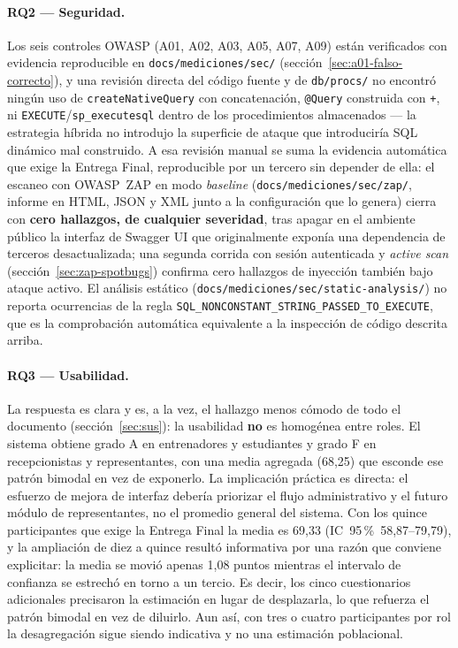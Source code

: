\documentclass[11pt,a4paper]{article}
\newcommand{\ruta}[1]{\texttt{\footnotesize #1}}
\begin{document}
\paragraph{RQ2 — Seguridad.} Los seis controles OWASP (A01, A02, A03, A05,
A07, A09) están verificados con evidencia reproducible en
\ruta{docs/mediciones/sec/} (sección~\ref{sec:a01-falso-correcto}), y una
revisión directa del código fuente y de \ruta{db/procs/} no encontró
ningún uso de \texttt{createNativeQuery} con concatenación, \texttt{@Query}
construida con \texttt{+}, ni \texttt{EXECUTE}/\texttt{sp\_executesql}
dentro de los procedimientos almacenados — la estrategia híbrida no
introdujo la superficie de ataque que introduciría SQL dinámico mal
construido. A esa revisión manual se suma la evidencia automática que exige la
Entrega Final, reproducible por un tercero sin depender de ella: el
escaneo con OWASP~ZAP en modo \emph{baseline}
(\ruta{docs/mediciones/sec/zap/}, informe en HTML, JSON y XML junto a la
configuración que lo genera) cierra con \textbf{cero hallazgos, de
cualquier severidad}, tras apagar en el ambiente público la interfaz de
Swagger UI que originalmente exponía una dependencia de terceros
desactualizada; una segunda corrida con sesión autenticada y
\emph{active scan} (sección~\ref{sec:zap-spotbugs}) confirma cero
hallazgos de inyección también bajo ataque activo. El análisis
estático (\ruta{docs/mediciones/sec/static-analysis/}) no reporta
ocurrencias de la regla
\texttt{SQL\_NONCONSTANT\_STRING\_PASSED\_TO\_EXECUTE}, que es la
comprobación automática equivalente a la inspección de código descrita
arriba.

\paragraph{RQ3 — Usabilidad.} La respuesta es clara y es, a la vez, el
hallazgo menos cómodo de todo el documento (sección~\ref{sec:sus}): la
usabilidad \textbf{no} es homogénea entre roles. El sistema obtiene grado
A en entrenadores y estudiantes y grado F en recepcionistas y
representantes, con una media agregada (68{,}25) que esconde ese patrón
bimodal en vez de exponerlo. La implicación práctica es directa: el
esfuerzo de mejora de interfaz debería priorizar el flujo administrativo y
el futuro módulo de representantes, no el promedio general del sistema.
Con los quince participantes que exige la Entrega Final la media es
69{,}33 (IC~95\,\%~58{,}87--79{,}79), y la ampliación de diez a quince
resultó informativa por una razón que conviene explicitar: la media se
movió apenas 1{,}08 puntos mientras el intervalo de confianza se estrechó
en torno a un tercio. Es decir, los cinco cuestionarios adicionales precisaron la
estimación en lugar de desplazarla, lo que refuerza el patrón bimodal en
vez de diluirlo. Aun así, con tres o cuatro participantes por rol la
desagregación sigue siendo indicativa y no una estimación poblacional.
\end{document}
